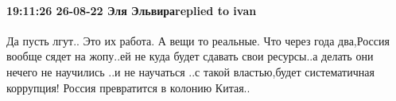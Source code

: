  
 
 
 
 

\paragraph{19:11:26 26-08-22 Эля Эльвираreplied to ivan}

Да пусть лгут..
Это их работа.
А вещи то реальные.
Что через года два,Россия вообще сядет на жопу..ей не куда будет сдавать свои ресурсы..а делать они нечего не научились ..и не научаться ..с такой властью,будет систематичная коррупция!
Россия превратится в колонию Китая..
